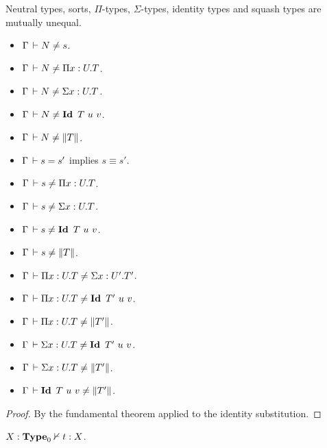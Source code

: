 \documentclass[a4paper,english]{lipics-utf8x}
\begin{document}
  \begin{lemma}
    \label{lem:cons-discr}
    Neutral types, sorts, $\Pi$-types, $\Sigma$-types, identity types and
    squash types are mutually unequal.
    \leavevmode
    \begin{itemize}
      \item $\Gamma \,\vdash N \neq s$.
      \item $\Gamma \,\vdash N \neq \Pi x:U.T$.
      \item $\Gamma \,\vdash N \neq \Sigma x:U.T$.
      \item $\Gamma \der N \neq \Id T\ u\ v$.
      \item $\Gamma \,\vdash N \neq \|T\|$.
      \item $\Gamma \,\vdash s = s'$ implies $s \equiv s'$.
      \item $\Gamma \,\vdash s \neq \Pi x:U.T$.
      \item $\Gamma \,\vdash s \neq \Sigma x:U.T$.
      \item $\Gamma \der s \neq \Id T\ u\ v$.
      \item $\Gamma \,\vdash s \neq \|T\|$.
      \item $\Gamma \,\vdash \Pi x:U.T \neq \Sigma x:U'.T'$.
      \item $\Gamma \der \Pi x:U.T \neq \Id T'\ u\ v$.
      \item $\Gamma \,\vdash \Pi x:U.T \neq \|T'\|$.
      \item $\Gamma \der \Sigma x:U.T \neq \Id T'\ u\ v$.
      \item $\Gamma \,\vdash \Sigma x:U.T \neq \|T'\|$.
      \item $\Gamma \,\vdash \operatorname{\mathbf{Id}~} T\ u\ v \neq \|T'\|$.
    \end{itemize}
  \end{lemma}

  \begin{proof}
    By the fundamental theorem applied to the identity substitution.
  \end{proof}

  \begin{theorem}[Consistency]
    $X : \operatorname{\mathbf{Type}}_0 \nvdash t : X$.
  \end{theorem}
\end{document}
